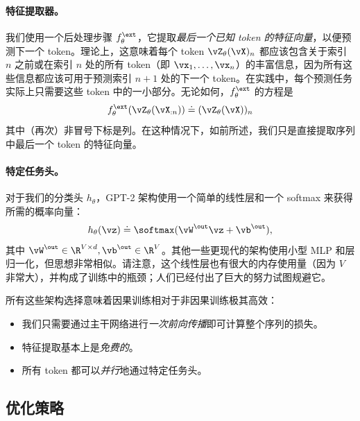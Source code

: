 \documentclass[../../book-main_zh.tex]{subfiles}
\begin{document}
\paragraph{特征提取器。} 我们使用一个后处理步骤 \(f_{\theta}^{\ext}\)，它提取\textit{最后一个已知 token 的特征向量}，以便预测下一个 token。理论上，这意味着每个 token \(\vZ_{\theta}(\vX)_{n}\) 都应该包含关于索引 \(n\) 之前或在索引 \(n\) 处的所有 token（即 \(\vx_{1}, \dots, \vx_{n}\)）的丰富信息，因为所有这些信息都应该可用于预测索引 \(n + 1\) 处的下一个 token。在实践中，每个预测任务实际上只需要这些 token 中的一小部分。无论如何，\(f_{\theta}^{\ext}\) 的方程是
\begin{equation}
f_{\theta}^{\ext}(\vZ_{\theta}(\vX_{:n})) \doteq (\vZ_{\theta}(\vX))_{n}
\end{equation}
其中（再次）非冒号下标是列。在这种情况下，如前所述，我们只是直接提取序列中最后一个 token 的特征向量。

\paragraph{特定任务头。} 对于我们的分类头 \(h_{\theta}\)，GPT-2 架构使用一个简单的线性层和一个 softmax 来获得所需的概率向量：
\begin{equation}
h_{\theta}(\vz) \doteq \softmax(\vW^{\out}\vz + \vb^{\out}),
\end{equation}
其中 \(\vW^{\out} \in \R^{V \times d}, \vb^{\out} \in \R^{V}\)。其他一些更现代的架构使用小型 MLP 和层归一化，但思想非常相似。请注意，这个线性层也有很大的内存使用量（因为 \(V\) 非常大），并构成了训练中的瓶颈；人们已经付出了巨大的努力试图规避它。

所有这些架构选择意味着因果训练相对于非因果训练极其高效：
\begin{itemize}
\item 我们只需要通过主干网络进行\textit{一次前向传播}即可计算整个序列的损失。
\item 特征提取基本上是\textit{免费的}。
\item 所有 token 都可以\textit{并行}地通过特定任务头。
\end{itemize}

\subsection{优化策略}
\end{document}

